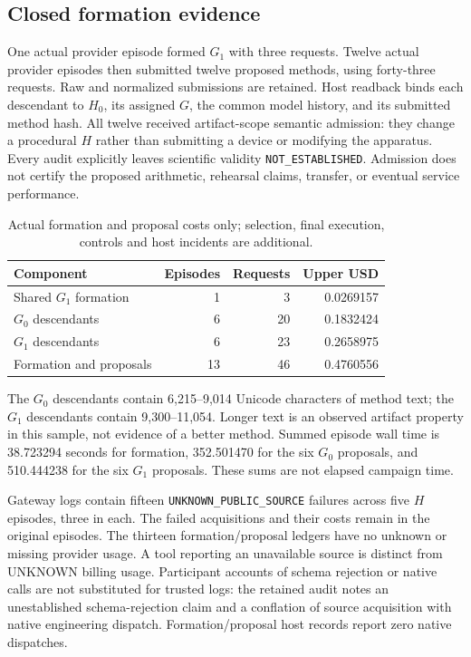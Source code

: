 \subsection{Closed formation evidence}

One actual provider episode formed $G_1$ with three requests. Twelve actual
provider episodes then submitted twelve proposed methods, using forty-three
requests. Raw and normalized submissions are retained. Host readback binds
each descendant to $H_0$, its assigned $G$, the common model history, and its
submitted method hash. All twelve received artifact-scope semantic admission:
they change a procedural $H$ rather than submitting a device or modifying
the apparatus. Every audit explicitly leaves scientific validity
\texttt{NOT\_ESTABLISHED}. Admission does not certify the proposed arithmetic,
rehearsal claims, transfer, or eventual service performance.

\begin{table}[htbp]
\centering
\small
\begin{tabular}{lrrr}
\toprule
Component & Episodes & Requests & Upper USD \\
\midrule
Shared $G_1$ formation & 1 & 3 & 0.0269157 \\
$G_0$ descendants & 6 & 20 & 0.1832424 \\
$G_1$ descendants & 6 & 23 & 0.2658975 \\
Formation and proposals & 13 & 46 & 0.4760556 \\
\bottomrule
\end{tabular}
\caption{Actual formation and proposal costs only; selection, final execution, controls and host incidents are additional.}
\label{tab:formation}
\end{table}

The $G_0$ descendants contain 6,215--9,014 Unicode characters of method text;
the $G_1$ descendants contain 9,300--11,054. Longer text is an observed artifact
property in this sample, not evidence of a better method. Summed episode wall
time is 38.723294 seconds for formation, 352.501470 for the six $G_0$
proposals, and 510.444238 for the six $G_1$ proposals. These sums are not
elapsed campaign time.

Gateway logs contain fifteen \texttt{UNKNOWN\_PUBLIC\_SOURCE} failures across
five $H$ episodes, three in each. The failed acquisitions and their costs
remain in the original episodes. The thirteen formation/proposal ledgers have
no unknown or missing provider usage. A tool reporting an unavailable source
is distinct from UNKNOWN billing usage. Participant accounts of schema
rejection or native calls are not substituted for trusted logs: the retained
audit notes an unestablished schema-rejection claim and a conflation of source
acquisition with native engineering dispatch. Formation/proposal host records
report zero native dispatches.

